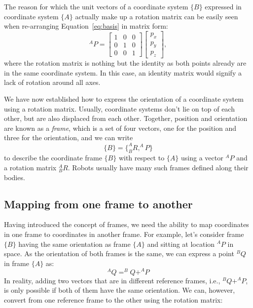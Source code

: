 The reason for which the unit vectors of a coordinate system $\{B\}$ expressed in coordinate system $\{A\}$ actually make up a rotation matrix can be easily seen when re-arranging Equation~\ref{eq:basis} in matrix form:
\begin{equation}
^AP=\left[\begin{array}{ccc}1 & 0 & 0\\0 & 1 & 0\\0 & 0 & 1\end{array}\right]\left[\begin{array}{c}p_x\\p_y\\p_z\end{array}\right],
\end{equation}
where the rotation matrix is nothing but the identity as both points already are in the same coordinate system. In this case, an identity matrix would signify a lack of rotation around all axes.

We have now established how to express the orientation of a coordinate system using a rotation matrix. Usually, coordinate systems don't lie on top of each other, but are also displaced from each other.
Together, position and orientation are known as a \emph{frame}, which is a set of four vectors, one for the position and three for the orientation, and we can write
%
\begin{equation}
\{B\}=\{^A_BR, ^AP\}
\end{equation}
%
to describe the coordinate frame $\{B\}$ with respect to $\{A\}$ using a vector $^AP$ and a rotation matrix $^A_BR$. Robots usually have many such frames defined along their bodies.

\subsection{Mapping from one frame to another}


Having introduced the concept of frames, we need the ability to map coordinates in one frame to coordinates in another frame. For example, let's consider frame $\{B\}$ having the same orientation as frame $\{A\}$ and sitting at location $^AP$ in space. As the orientation of both frames is the same, we can express a point $ ^BQ$ in frame $\{A\}$ as:
%
\begin{equation}
^AQ=^BQ+^AP
\end{equation}
%
In reality, adding two vectors that are in different reference frames, i.e., $ ^BQ+^AP$, is only possible if both of them have the same orientation. We can, however, convert from one reference frame to the other using the rotation matrix:

